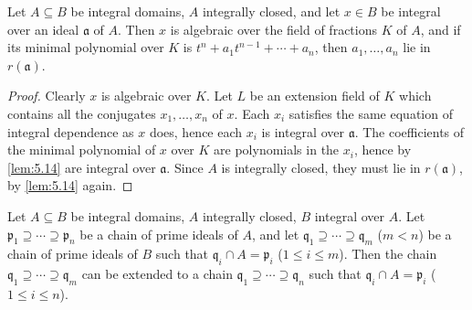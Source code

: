 \begin{proposition}\label{prop:5.15}
    Let $A \subseteq B$ be integral domains, $A$ integrally closed, and let $x \in B$ be integral over an ideal $\mathfrak{a}$ of $A$. Then $x$ is algebraic over the field of fractions $K$ of $A$, and if its minimal polynomial over $K$ is $t^n + a_1 t^{n-1} + \cdots + a_n$, then $a_1, \ldots, a_n$ lie in $r(\mathfrak{a})$.
\end{proposition}

\begin{proof}
Clearly $x$ is algebraic over $K$. Let $L$ be an extension field of $K$ which contains all the conjugates $x_1, \ldots, x_n$ of $x$. Each $x_i$ satisfies the same equation of integral dependence as $x$ does, hence each $x_i$ is integral over $\mathfrak{a}$. The coefficients of the minimal polynomial of $x$ over $K$ are polynomials in the $x_i$, hence by \eqref{lem:5.14} are integral over $\mathfrak{a}$. Since $A$ is integrally closed, they must lie in $r(\mathfrak{a})$, by \eqref{lem:5.14} again.
\end{proof}

\begin{theorem}\label{thm:5.16}
Let $A \subseteq B$ be integral domains, $A$ integrally closed, $B$ integral over $A$. Let $\mathfrak{p}_1 \supseteq \cdots \supseteq \mathfrak{p}_n$ be a chain of prime ideals of $A$, and let $\mathfrak{q}_1 \supseteq \cdots \supseteq \mathfrak{q}_m$ ($m < n$) be a chain of prime ideals of $B$ such that $\mathfrak{q}_i \cap A = \mathfrak{p}_i$ ($1 \leq i \leq m$). Then the chain $\mathfrak{q}_1 \supseteq \cdots \supseteq \mathfrak{q}_m$ can be extended to a chain $\mathfrak{q}_1 \supseteq \cdots \supseteq \mathfrak{q}_n$ such that $\mathfrak{q}_i \cap A = \mathfrak{p}_i$ ($1 \leq i \leq n$).
\end{theorem}

